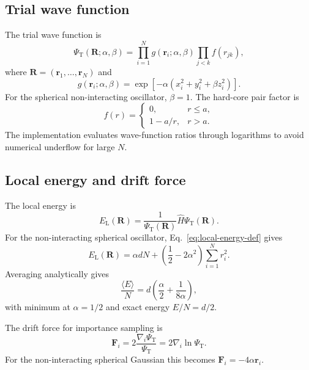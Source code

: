 \documentclass[10pt,a4paper]{article}
\newcommand{\br}{\mathbf{r}}
\newcommand{\bR}{\mathbf{R}}
\newcommand{\EL}{E_{\mathrm{L}}}
\newcommand{\PsiT}{\Psi_{\mathrm{T}}}
\begin{document}
\subsection{Trial wave function}

The trial wave function is
\begin{equation}
    \PsiT(\bR;\alpha,\beta)=
    \prod_{i=1}^{N}g(\br_i;\alpha,\beta)
    \prod_{j<k} f(r_{jk}),
    \label{eq:trial}
\end{equation}
where $\bR=(\br_1,\ldots,\br_N)$ and
\begin{equation}
    g(\br_i;\alpha,\beta)=\exp\left[-\alpha(x_i^2+y_i^2+\beta z_i^2)\right].
    \label{eq:gaussian}
\end{equation}
For the spherical non-interacting oscillator, $\beta=1$. The hard-core pair factor is
\begin{equation}
    f(r)=
    \begin{cases}
    0, & r\le a,\\
    1-a/r, & r>a.
    \end{cases}
    \label{eq:jastrow}
\end{equation}
The implementation evaluates wave-function ratios through logarithms to avoid numerical underflow for large $N$.

\subsection{Local energy and drift force}

The local energy is
\begin{equation}
    \EL(\bR)=\frac{1}{\PsiT(\bR)}\hat{H}\PsiT(\bR).
    \label{eq:local-energy-def}
\end{equation}
For the non-interacting spherical oscillator, Eq.~\eqref{eq:local-energy-def} gives
\begin{equation}
    \EL(\bR)=\alpha dN+\left(\frac{1}{2}-2\alpha^2\right)\sum_{i=1}^{N}r_i^2.
    \label{eq:local-energy-nonint}
\end{equation}
Averaging analytically gives
\begin{equation}
    \frac{\langle E\rangle}{N}=d\left(\frac{\alpha}{2}+\frac{1}{8\alpha}\right),
    \label{eq:variational-energy-nonint}
\end{equation}
with minimum at $\alpha=1/2$ and exact energy $E/N=d/2$.

The drift force for importance sampling is
\begin{equation}
    \mathbf{F}_i=2\frac{\nabla_i\PsiT}{\PsiT}=2\nabla_i\ln\PsiT.
    \label{eq:drift-force}
\end{equation}
For the non-interacting spherical Gaussian this becomes $\mathbf{F}_i=-4\alpha\br_i$.
\end{document}
